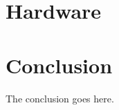 \documentclass[journal,onecolumn]{IEEEtran}
\begin{document}
\section{Hardware} \label{sec:hardware}







\section{Conclusion}
The conclusion goes here.






\end{document}
